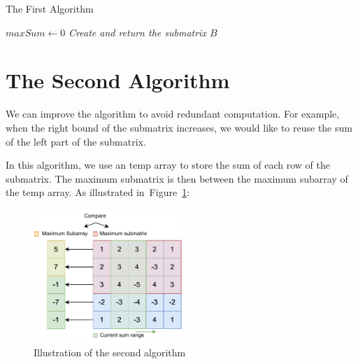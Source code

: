 \documentclass[a4paper,oneside]{book}
\begin{document}
\begin{algorithm}[H]
    \caption{The First Algorithm}\label{alg:1}
    \DontPrintSemicolon
    \BlankLine
    $maxSum \gets 0$\;
    \emph{Create and return the submatrix $B$}\;
\end{algorithm}

\section{The Second Algorithm}

We can improve the algorithm to avoid redundant computation. For example, when
the right bound of the submatrix increases, we would like to reuse the sum of
the left part of the submatrix.

In this algorithm, we use an temp array to store the sum of each row of the
submatrix. The maximum submatrix is then between the maximum subarray of the
temp array. As illustrated in~Figure~\ref{fig:alg2}:

\begin{figure}[!ht]
    \centering
    \caption{Illustration of the second algorithm}\label{fig:alg2}
    \includegraphics[width=0.5\textwidth]{alg2}
\end{figure}
\end{document}

